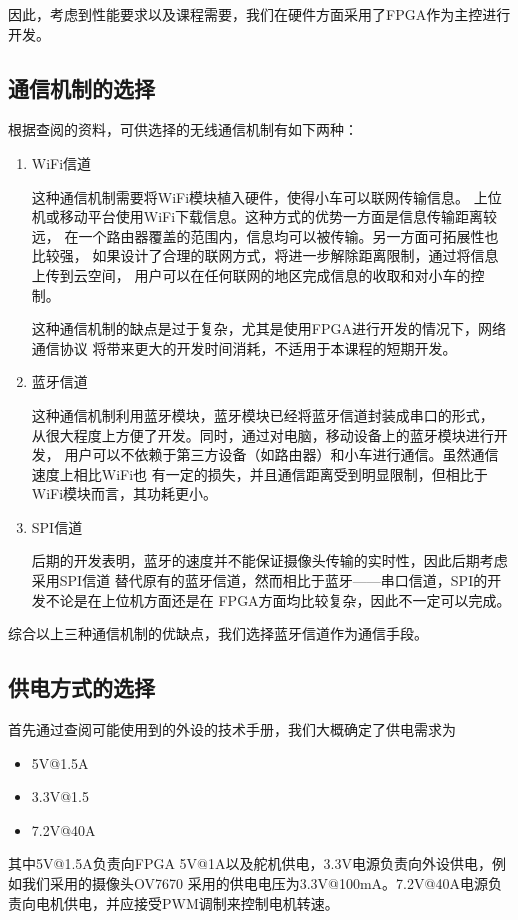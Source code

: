 \documentclass[a4paper]{paper}
\begin{document}
因此，考虑到性能要求以及课程需要，我们在硬件方面采用了FPGA作为主控进行开发。
\subsection{通信机制的选择}
根据查阅的资料，可供选择的无线通信机制有如下两种：

\begin{enumerate}
    \item WiFi信道

    这种通信机制需要将WiFi模块植入硬件，使得小车可以联网传输信息。
    上位机或移动平台使用WiFi下载信息。这种方式的优势一方面是信息传输距离较远，
    在一个路由器覆盖的范围内，信息均可以被传输。另一方面可拓展性也比较强，
    如果设计了合理的联网方式，将进一步解除距离限制，通过将信息上传到云空间，
    用户可以在任何联网的地区完成信息的收取和对小车的控制。

    这种通信机制的缺点是过于复杂，尤其是使用FPGA进行开发的情况下，网络通信协议
    将带来更大的开发时间消耗，不适用于本课程的短期开发。

    \item 蓝牙信道

    这种通信机制利用蓝牙模块，蓝牙模块已经将蓝牙信道封装成串口的形式，
    从很大程度上方便了开发。同时，通过对电脑，移动设备上的蓝牙模块进行开发，
    用户可以不依赖于第三方设备（如路由器）和小车进行通信。虽然通信速度上相比WiFi也
    有一定的损失，并且通信距离受到明显限制，但相比于WiFi模块而言，其功耗更小。

    \item SPI信道

    后期的开发表明，蓝牙的速度并不能保证摄像头传输的实时性，因此后期考虑采用SPI信道
    替代原有的蓝牙信道，然而相比于蓝牙——串口信道，SPI的开发不论是在上位机方面还是在
    FPGA方面均比较复杂，因此不一定可以完成。

\end{enumerate}
综合以上三种通信机制的优缺点，我们选择蓝牙信道作为通信手段。
\subsection{供电方式的选择}
首先通过查阅可能使用到的外设的技术手册，我们大概确定了供电需求为
\begin{itemize}
    \item 5V@1.5A
    \item 3.3V@1.5
    \item 7.2V@40A
\end{itemize}
其中5V@1.5A负责向FPGA 5V@1A以及舵机供电，3.3V电源负责向外设供电，例如我们采用的摄像头OV7670
采用的供电电压为3.3V@100mA。7.2V@40A电源负责向电机供电，并应接受PWM调制来控制电机转速。
\end{document}

